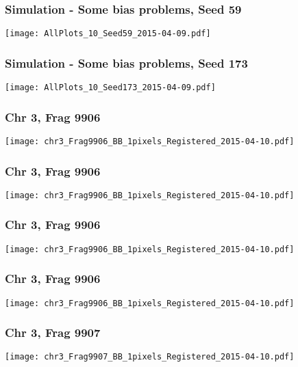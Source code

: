 \documentclass[10pt,dvipsnames,table]{beamer}
\begin{document}
\begin{frame}
\frametitle{Simulation - Some bias problems, Seed 59}
\begin{center}
\texttt{[image: AllPlots\_10\_Seed59\_2015-04-09.pdf]}
\end{center}
\end{frame}

\begin{frame}
\frametitle{Simulation - Some bias problems, Seed 173}
\begin{center}
\texttt{[image: AllPlots\_10\_Seed173\_2015-04-09.pdf]}
\end{center}
\end{frame}


\begin{frame}
\frametitle{Chr 3, Frag 9906}
\begin{center}
\texttt{[image: chr3\_Frag9906\_BB\_1pixels\_Registered\_2015-04-10.pdf]}
\end{center}
\end{frame}

\begin{frame}
\frametitle{Chr 3, Frag 9906}
\begin{center}
\texttt{[image: chr3\_Frag9906\_BB\_1pixels\_Registered\_2015-04-10.pdf]}
\end{center}
\end{frame}

\begin{frame}
\frametitle{Chr 3, Frag 9906}
\begin{center}
\texttt{[image: chr3\_Frag9906\_BB\_1pixels\_Registered\_2015-04-10.pdf]}
\end{center}
\end{frame}

\begin{frame}
\frametitle{Chr 3, Frag 9906}
\begin{center}
\texttt{[image: chr3\_Frag9906\_BB\_1pixels\_Registered\_2015-04-10.pdf]}
\end{center}
\end{frame}

\begin{frame}
\frametitle{Chr 3, Frag 9907}
\begin{center}
\texttt{[image: chr3\_Frag9907\_BB\_1pixels\_Registered\_2015-04-10.pdf]}
\end{center}
\end{frame}
\end{document}
